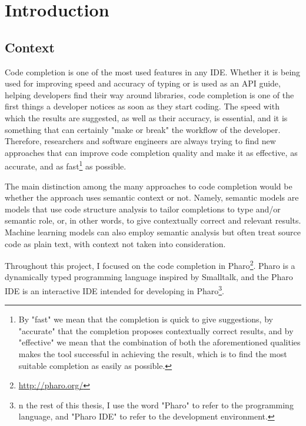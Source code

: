 \chapter{Introduction}
\label{chap:Introduction}

\section{Context}
\label{sec:Introduction-Context}
Code completion is one of the most used features in any IDE. Whether it is being used for improving speed and accuracy of typing or is used as an API guide, helping developers find their way around libraries, code completion is one of the first things a developer notices as soon as they start coding. The speed with which the results are suggested, as well as their accuracy, is essential, and it is something that can certainly "make or break" the workflow of the developer. Therefore, researchers and software engineers are always trying to find new approaches that can improve code completion quality and make it as effective, as accurate, and as fast\footnote{By "fast" we mean that the completion is quick to give suggestions, by "accurate" that the completion proposes contextually correct results, and by "effective" we mean that the combination of both the aforementioned qualities makes the tool successful in achieving the result, which is to find the most suitable completion as easily as possible.} as possible.

The main distinction among the many approaches to code completion would be whether the approach uses semantic context or not. Namely, semantic models are models that use code structure analysis to tailor completions to type and/or semantic role, or, in other words, to give contextually correct and relevant results. Machine learning models can also employ semantic analysis but often treat source code as plain text, with context not taken into consideration.

Throughout this project, I focused on the code completion in Pharo\footnote{\url{http://pharo.org/}}. Pharo is a dynamically typed programming language inspired by Smalltalk, and the Pharo IDE is an interactive IDE intended for developing in Pharo\footnote{n the rest of this thesis, I use the word "Pharo" to refer to the programming language, and "Pharo IDE" to refer to the development environment.}.

